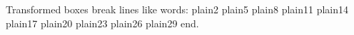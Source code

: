 \documentclass{article}
\begin{document}
Transformed boxes break lines like words:   plain2   plain5   plain8   plain11   plain14   plain17   plain20   plain23   plain26   plain29 end.
\end{document}
